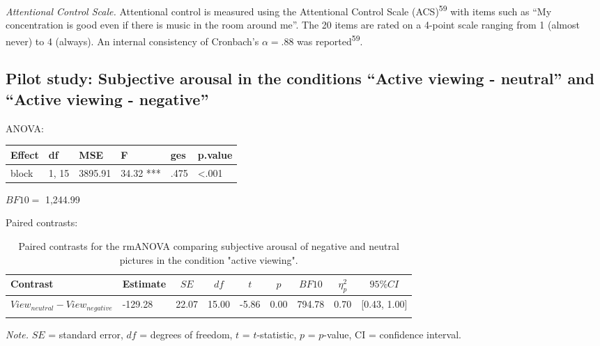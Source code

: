 \documentclass[
  man,floatsintext]{apa6}
\begin{document}
\emph{Attentional Control Scale.} Attentional control is measured using the Attentional Control Scale (ACS)\textsuperscript{59} with items such as ``My concentration is good even if there is music in the room around me''.
The 20 items are rated on a 4-point scale ranging from 1 (almost never) to 4 (always).
An internal consistency of Cronbach's \(\alpha=.88\) was reported\textsuperscript{59}.

\newpage

\hypertarget{pilot-study-subjective-arousal-in-the-conditions-active-viewing---neutral-and-active-viewing---negative}{%
\subsection{Pilot study: Subjective arousal in the conditions ``Active viewing - neutral'' and ``Active viewing - negative''}\label{pilot-study-subjective-arousal-in-the-conditions-active-viewing---neutral-and-active-viewing---negative}}

ANOVA:

\begin{tabular}{l|l|l|l|l|l}
\hline
Effect & df & MSE & F & ges & p.value\\
\hline
block & 1, 15 & 3895.91 & 34.32 *** & .475 & <.001\\
\hline
\end{tabular}

\(BF10=\) 1,244.99

Paired contrasts:

\begin{table}[H]

\begin{center}
\begin{threeparttable}

\caption{\label{tab:unnamed-chunk-4}Paired contrasts for the rmANOVA comparing subjective arousal of negative and neutral pictures in the condition "active viewing".}

\begin{tabular}{lllllllll}
\toprule
Contrast & \multicolumn{1}{c}{Estimate} & \multicolumn{1}{c}{$SE$} & \multicolumn{1}{c}{$df$} & \multicolumn{1}{c}{$t$} & \multicolumn{1}{c}{$p$} & \multicolumn{1}{c}{$BF10$} & \multicolumn{1}{c}{$\eta_{p}^{2}$} & \multicolumn{1}{c}{$95\% CI$}\\
\midrule
$View_{neutral} - View_{negative}$ & -129.28 & 22.07 & 15.00 & -5.86 & 0.00 & 794.78 & 0.70 & {}[0.43, 1.00]\\
\bottomrule
\addlinespace
\end{tabular}

\begin{tablenotes}[para]
\normalsize{\textit{Note.} $SE$ = standard error, $df$ = degrees of freedom, $t$ = $t$-statistic, $p$ = $p$-value, CI = confidence interval.}
\end{tablenotes}

\end{threeparttable}
\end{center}

\end{table}
\end{document}
